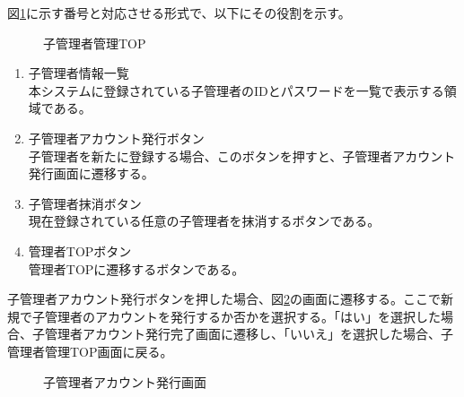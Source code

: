 \documentclass[a4j]{jarticle}
\begin{document}
図\ref{fig:admin_child_top}に示す番号と対応させる形式で、以下にその役割を示す。
\begin{figure}[H]
\centering
{}
\caption{子管理者管理TOP}
\label{fig:admin_child_top}
\end{figure}
\begin{enumerate}
  \renewcommand{\labelenumi}{\textcircled{\scriptsize \theenumi}}
  \item 子管理者情報一覧\\
  本システムに登録されている子管理者のIDとパスワードを一覧で表示する領域である。
  \item 子管理者アカウント発行ボタン\\
  子管理者を新たに登録する場合、このボタンを押すと、子管理者アカウント発行画面に遷移する。
  \item 子管理者抹消ボタン\\
  現在登録されている任意の子管理者を抹消するボタンである。
  \item 管理者TOPボタン\\
  管理者TOPに遷移するボタンである。
\end{enumerate}
子管理者アカウント発行ボタンを押した場合、図\ref{fig:create_admin}の画面に遷移する。ここで新規で子管理者のアカウントを発行するか否かを選択する。「はい」を選択した場合、子管理者アカウント発行完了画面に遷移し、「いいえ」を選択した場合、子管理者管理TOP画面に戻る。
\begin{figure}[H]
\centering
{}
\caption{子管理者アカウント発行画面}
\label{fig:create_admin}
\end{figure}
\end{document}
